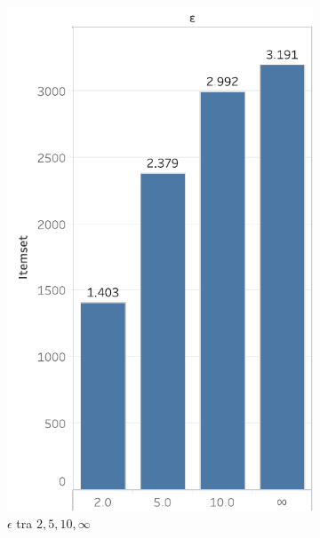 \begin{figure}
  \centering
   \begin{subfigure}{.5\textwidth}
  \centering
    \includegraphics[scale=0.5]{res/fig/sec-4/itemset/ItemsetEpsilon.pdf}
   \caption{\(\epsilon\) tra \(2,5,10,\infty\)}
  \label{fig:chap-4:ItemsetEpsilon}
\end{subfigure}%
\begin{subfigure}{.5\textwidth}
  \centering

\end{subfigure}
\end{figure}
